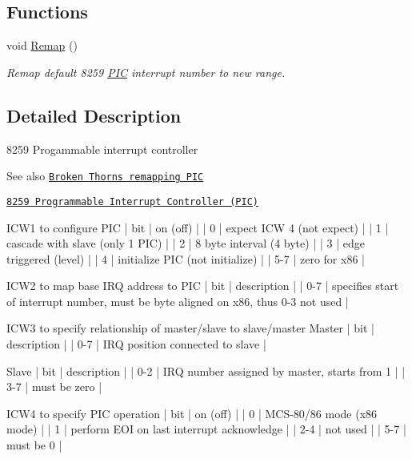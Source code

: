 \subsection*{Functions}
\begin{DoxyCompactItemize}
\item 
void \hyperlink{namespace_p_i_c_a2a04fe95329faacc43f00ad30fe554b9}{Remap} ()
\begin{DoxyCompactList}\small\item\em Remap default 8259 \hyperlink{namespace_p_i_c}{P\+IC} interrupt number to new range. \end{DoxyCompactList}\end{DoxyCompactItemize}


\subsection{Detailed Description}
8259 Progammable interrupt controller 

\begin{DoxySeeAlso}{See also}
\href{http://www.brokenthorn.com/Resources/OSDevPic.html}{\tt Broken Thorn\textquotesingle{}s remapping P\+IC} 

\href{https://stanislavs.org/helppc/8259.html}{\tt 8259 Programmable Interrupt Controller (P\+IC)}
\end{DoxySeeAlso}
\begin{DoxyVerb}ICW1 to configure PIC
| bit | on (off)                        |
|   0 | expect ICW 4 (not expect)       |
|   1 | cascade with slave (only 1 PIC) |
|   2 | 8 byte interval (4 byte)        |
|   3 | edge triggered (level)          |
|   4 | initialize PIC (not initialize) |
| 5-7 | zero for x86                    |

ICW2 to map base IRQ address to PIC
| bit | description                                                                         |
| 0-7 | specifies start of interrupt number, must be byte aligned on x86, thus 0-3 not used |

ICW3 to specify relationship of master/slave to slave/master
    Master
    | bit | description                     |
    | 0-7 | IRQ position connected to slave |

    Slave
    | bit | description                                  |
    | 0-2 | IRQ number assigned by master, starts from 1 |
    | 3-7 | must be zero                                 |

ICW4 to specify PIC operation
| bit | on (off)                                  |
|   0 | MCS-80/86 mode (x86 mode)                 |
|   1 | perform EOI on last interrupt acknowledge |
| 2-4 | not used                                  |
| 5-7 | must be 0                                 |
\end{DoxyVerb}
 

